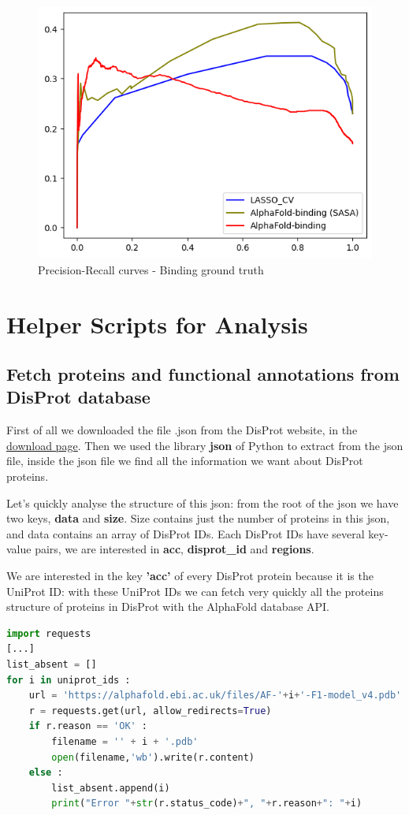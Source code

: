 \begin{figure}[h!]
    \centering
    \includegraphics[scale = 0.75]{res/ML/precisionrecall-binding.png}
    \caption{Precision-Recall curves - Binding ground truth}
\end{figure}

\pagebreak

\section{Helper Scripts for Analysis}\label{analysis-procedures}
\subsection{Fetch proteins and functional annotations from DisProt database}
First of all we downloaded the file .json from the DisProt website, in the \href{https://disprot.org/download}{\underline{download page}}. Then we used the library \textbf{json} of Python to extract from the json file, inside the json file we find all the information we want about DisProt proteins. 

Let's quickly analyse the structure of this json: from the root of the json we have two keys, \textbf{data} and \textbf{size}. Size contains just the number of proteins in this json, and data contains an array of DisProt IDs. Each DisProt IDs have several key-value pairs, we are interested in \textbf{acc}, \textbf{disprot\_id} and \textbf{regions}.

We are interested in the key \textbf{'acc'} of every DisProt protein because it is the UniProt ID: with these UniProt IDs we can fetch very quickly all the proteins structure of proteins in DisProt with the AlphaFold database API.
\begin{lstlisting}[language=Python, caption=Script to use AlphaFold database API]
import requests
[...]
list_absent = []
for i in uniprot_ids :
    url = 'https://alphafold.ebi.ac.uk/files/AF-'+i+'-F1-model_v4.pdb'
    r = requests.get(url, allow_redirects=True)
    if r.reason == 'OK' :
        filename = '' + i + '.pdb'
        open(filename,'wb').write(r.content)
    else :
        list_absent.append(i)
        print("Error "+str(r.status_code)+", "+r.reason+": "+i)
\end{lstlisting}

